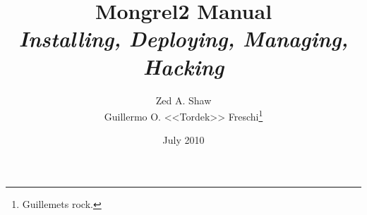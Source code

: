 


\title{
    Mongrel2 Manual\\
    \textit{Installing, Deploying, Managing, Hacking}
}
\author{Zed A. Shaw \\ \small{Guillermo O. <<Tordek>> Freschi}\thanks{Guillemets rock.}}
\date{July 2010}



\frontmatter

\maketitle

\tableofcontents



\mainmatter








\appendix



